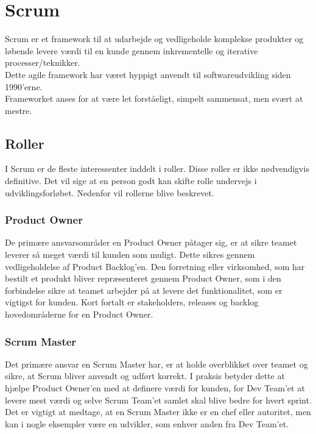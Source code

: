 \section{Scrum}\label{sec:scrum}
Scrum er et framework til at udarbejde og vedligeholde komplekse produkter og løbende levere 
værdi til en kunde gennem inkrementelle og iterative processer/teknikker. \\

Dette agile framework har været hyppigt anvendt til softwareudvikling siden 1990’erne. \\

Frameworket anses for at være let forståeligt, simpelt sammensat, men svært at mestre.

\subsection{Roller}
I Scrum er de fleste interessenter inddelt i roller. Disse roller er ikke nødvendigvis definitive. Det vil sige at
en person godt kan skifte rolle undervejs i udviklingsforløbet. Nedenfor vil rollerne blive beskrevet.

\subsubsection{Product Owner}
De primære ansvarsområder en Product Owner påtager sig, er at sikre teamet leverer så 
meget værdi til kunden som muligt. Dette sikres gennem vedligeholdelse af Product Backlog’en. 
Den forretning eller virksomhed, som har bestilt et produkt bliver repræsenteret gennem 
Product Owner, som i den forbindelse sikre at teamet arbejder på at levere det funktionalitet, 
som er vigtigst for kunden. Kort fortalt er stakeholders, releases og backlog hovedområderne for en Product Owner.

\subsubsection{Scrum Master}    
Det primære ansvar en Scrum Master har, er at holde overblikket over teamet og sikre, at Scrum bliver anvendt 
og udført korrekt. I praksis betyder dette at hjælpe Product Owner’en med at definere værdi for kunden, 
for Dev Team’et at levere mest værdi og selve Scrum Team’et samlet skal blive bedre for hvert sprint. 
Det er vigtigt at medtage, at en Scrum Master ikke er en chef eller autoritet, men kan i nogle eksempler 
være en udvikler, som enhver anden fra Dev Team’et.


